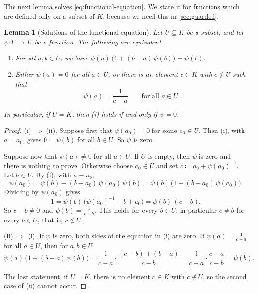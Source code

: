 \documentclass[11pt,a4paper]{article}
\theoremstyle{plain}
\newtheorem{lemma}[theorem]{Lemma}
\theoremstyle{definition}
\theoremstyle{remark}
\begin{document}
The next lemma solves \cref{eq:functional-equation}.
We state it for functions which are defined only on a subset of $K$, because we need this in \cref{sec:guarded}.

\begin{lemma}[Solutions of the functional equation]
    \label{lem:solutions}
    Let $U \subseteq K$ be a subset, and let $\psi \colon U \to K$ be a function.
    The following are equivalent.
    \begin{enumerate}[label=\textup{(\roman*)}]
        \item For all $a, b \in U$, we have $\psi(a)\, \bigl( 1 + (b - a)\, \psi(b) \bigr) = \psi(b)$.
        \item Either $\psi(a) = 0$ for all $a \in U$, or there is an element $c \in K$ with $c \notin U$ such that
              \begin{equation*}
                  \psi(a) = \frac{1}{c - a} \qquad \text{for all } a \in U .
              \end{equation*}
    \end{enumerate}
    In particular, if $U = K$, then \textup{(i)} holds if and only if $\psi = 0$.
\end{lemma}

\begin{proof}
    (i) $\Rightarrow$ (ii).
    Suppose first that $\psi(a_0) = 0$ for some $a_0 \in U$.
    Then (i), with $a = a_0$, gives $0 = \psi(b)$ for all $b \in U$.
    So $\psi$ is zero.

    Suppose now that $\psi(a) \neq 0$ for all $a \in U$.
    If $U$ is empty, then $\psi$ is zero and there is nothing to prove.
    Otherwise choose $a_0 \in U$ and set $c \coloneqq a_0 + \psi(a_0)^{-1}$.
    Let $b \in U$.
    By (i), with $a = a_0$,
    \begin{equation*}
        \psi(a_0) = \psi(b) - (b - a_0)\, \psi(a_0)\, \psi(b) = \psi(b)\, \bigl( 1 - (b - a_0)\, \psi(a_0) \bigr) .
    \end{equation*}
    Dividing by $\psi(a_0)$ gives
    \begin{equation*}
        1 = \psi(b)\, \bigl( \psi(a_0)^{-1} - b + a_0 \bigr) = \psi(b)\, (c - b) .
    \end{equation*}
    So $c - b \neq 0$ and $\psi(b) = \frac{1}{c - b}$.
    This holds for every $b \in U$; in particular $c \neq b$ for every $b \in U$, that is, $c \notin U$.

    (ii) $\Rightarrow$ (i).
    If $\psi$ is zero, both sides of the equation in (i) are zero.
    If $\psi(a) = \frac{1}{c - a}$ for all $a \in U$, then for $a, b \in U$
    \begin{equation*}
        \psi(a)\, \bigl( 1 + (b - a)\, \psi(b) \bigr)
        = \frac{1}{c - a} \cdot \frac{(c - b) + (b - a)}{c - b}
        = \frac{1}{c - a} \cdot \frac{c - a}{c - b}
        = \psi(b) .
    \end{equation*}

    The last statement: if $U = K$, there is no element $c \in K$ with $c \notin U$, so the second case of (ii) cannot occur.
\end{proof}
\end{document}
